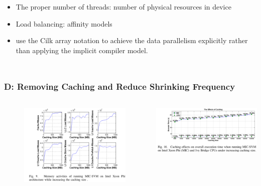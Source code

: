 \documentclass{beamer}
\begin{document}
\begin{frame}
\begin{columns}[c]
		\begin{itemize}
			\item The proper number of threads: number of physical resources in device
			\item Load balancing: affinity models
			\item use the Cilk
			array notation to achieve the data parallelism explicitly rather than
			applying the implicit compiler model.
					
		\end{itemize}	
	\end{columns}	
\end{frame}

\begin{frame}
	\frametitle{D: Removing Caching and Reduce Shrinking Frequency}
	\begin{columns}[c] %
		\begin{figure}
			\includegraphics[width=1\textwidth]{fig/fig9_memorytraits.png}
		\end{figure}
		\includegraphics[width=1\textwidth]{fig/fig10_cache.png}


\end{columns}
\end{frame}
\end{document}

